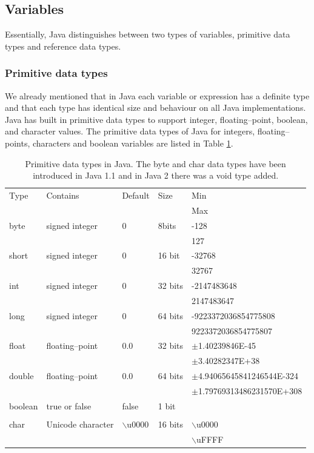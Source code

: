 \subsection{Variables}
\label{sec:Variables}

Essentially, Java distinguishes between two types of variables,
primitive data types and reference data types.
\subsubsection{Primitive data types}
\label{sec:primitive_data_types}
We already mentioned that in Java each variable or expression has a
definite type and that each type has identical size and behaviour on
all Java implementations.  Java has built in primitive data types
to support integer, floating--point, boolean, and character values.
The primitive data types of Java for integers, floating--points,
characters and boolean variables are listed in Table
\ref{table:primitivedata}.
\begin{table}[htbp]
\label{table:primitivedata}
\begin{center}
\begin{tabular}{l|l|l|l|l}
Type & Contains & Default & Size & Min \\
     &          &         &      & Max \\ \hline \hline
byte  & signed integer & 0 & 8bits & -128  \\
&&& & 127    \\ \hline
short & signed integer & 0 & 16 bit &-32768 \\
&&& & 32767 \\ \hline
int &   signed integer & 0 & 32 bits&-2147483648 \\
&&& &2147483647 \\ \hline
long & signed integer & 0 & 64 bits &-9223372036854775808\\
&&& &9223372036854775807\\ \hline
float & floating--point & 0.0 & 32 bits &$\pm$1.40239846E-45\\
&&& &$\pm$3.40282347E+38\\ \hline
double & floating--point & 0.0 & 64 bits &$\pm$4.94065645841246544E-324\\
&&& &$\pm$1.79769313486231570E+308\\ \hline
boolean & true or false      &  false & 1 bit&\\
&&&       &  \\ \hline
char  & Unicode character & $\backslash$u0000 & 16 bits & $\backslash$u0000 \\
&&& &$\backslash$uFFFF   \\ \hline
\end{tabular}
\end{center}
\caption{Primitive data types in Java. The byte and char data types have
  been introduced in Java 1.1 and in Java 2 there was a void type added.}
\end{table}


